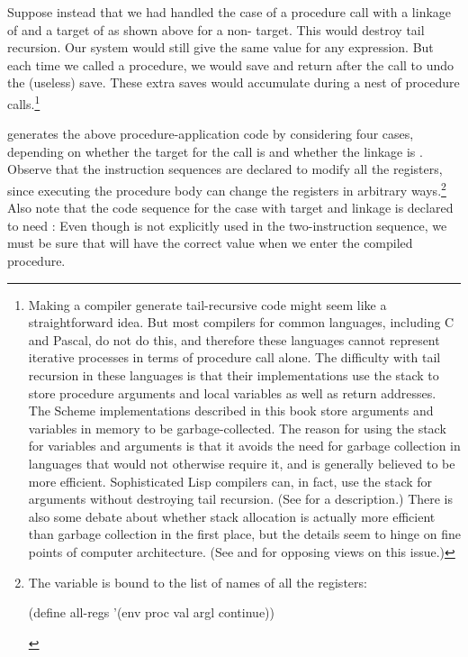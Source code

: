 Suppose instead that we had handled the case of a procedure call with a linkage
of  and a target of  as shown above for a non-
target.  This would destroy tail recursion.  Our system would still give the
same value for any expression.  But each time we called a procedure, we would
save  and return after the call to undo the (useless) save.
These extra saves would accumulate during a nest of procedure
calls.\footnote{Making a compiler generate tail-recursive code might seem like
a straightforward idea.  But most compilers for common languages, including C
and Pascal, do not do this, and therefore these languages cannot represent
iterative processes in terms of procedure call alone.  The difficulty with tail
recursion in these languages is that their implementations use the stack to
store procedure arguments and local variables as well as return addresses.  The
Scheme implementations described in this book store arguments and variables in
memory to be garbage-collected.  The reason for using the stack for variables
and arguments is that it avoids the need for garbage collection in languages
that would not otherwise require it, and is generally believed to be more
efficient.  Sophisticated Lisp compilers can, in fact, use the stack for
arguments without destroying tail recursion.  (See  for a
description.)  There is also some debate about whether stack allocation is
actually more efficient than garbage collection in the first place, but the
details seem to hinge on fine points of computer architecture.  (See 
and  for opposing views on this issue.)}

 generates the above procedure-application code by
considering four cases, depending on whether the target for the call is
 and whether the linkage is .  Observe that the
instruction sequences are declared to modify all the registers, since executing
the procedure body can change the registers in arbitrary ways.\footnote{The
variable  is bound to the list of names of all the registers:

\begin{compactCodeBlock}
(define all-regs '(env proc val argl continue))
\end{compactCodeBlock}
} Also note that the code sequence for the case with target  and
linkage  is declared to need : Even though
 is not explicitly used in the two-instruction sequence, we must
be sure that  will have the correct value when we enter the
compiled procedure.

